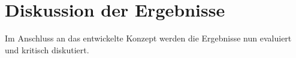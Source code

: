\section{Diskussion der Ergebnisse}
\label{evaluation}
Im Anschluss an das entwickelte Konzept werden die Ergebnisse nun evaluiert und kritisch diskutiert. 